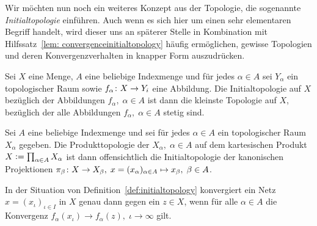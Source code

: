 \documentclass[../main/main.tex]{subfiles}
\begin{document}
	
	Wir möchten nun noch ein weiteres Konzept aus der Topologie, die sogenannte \emph{Initialtopologie} einführen.
	Auch wenn es sich hier um einen sehr elementaren Begriff handelt, wird dieser uns an späterer Stelle 
	in Kombination mit Hilfssatz~\ref{lem: convergenceinitialtopology} häufig ermöglichen, 
	gewisse Topologien und deren Konvergenzverhalten in knapper Form auszudrücken.
	
	\begin{Definition}[Initialtopologie]
		\label{def:initialtopology}
		Sei $X$ eine Menge, $A$ eine beliebige Indexmenge und für jedes $\alpha \in A$ sei $Y_\alpha$ ein topologischer Raum sowie $f_\alpha \colon X \to Y_i$ eine Abbildung.
		Die Initialtopologie auf $X$ bezüglich der Abbildungen $f_\alpha, \; \alpha \in A$ ist dann die kleinste Topologie auf $X$, bezüglich der alle Abbildungen 
		$f_\alpha, \; \alpha \in A$ stetig sind.
	\end{Definition}

	\begin{Bemerkung}[Produkttopologie]
		Sei $A$ eine beliebige Indexmenge und sei für jedes $\alpha \in A$ ein topologischer Raum $X_\alpha$ gegeben. Die Produkttopologie der $X_\alpha, \; \alpha \in A$
		auf dem kartesischen Produkt $X \vcentcolon = \prod_{\alpha \in A} X_\alpha$ ist dann offensichtlich die Initialtopologie der kanonischen Projektionen 
		$\pi_\beta \colon X \to X_\beta, \; x = (x_\alpha)_{\alpha \in A} \mapsto x_\beta , \; \beta \in A$.
	\end{Bemerkung}
	
	\begin{Hilfssatz}
		\label{lem: convergenceinitialtopology}
		In der Situation von Definition~\ref{def:initialtopology} konvergiert ein Netz $x = (x_\iota)_{\iota \in I}$ in $X$ genau dann gegen ein $z \in X$, wenn für alle $\alpha \in A$
		die Konvergenz $f_\alpha(x_\iota) \to f_\alpha(z), \; \iota \to \infty$ gilt.
	\end{Hilfssatz}
\end{document}
